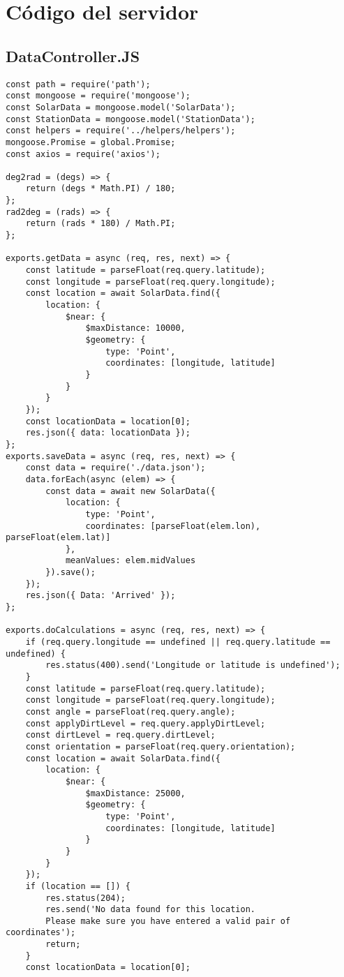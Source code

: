 \section{Código del servidor}

\subsection{DataController.JS}

\begin{lstlisting}[style=ES6, caption={Server/Controllers/dataController.js}]
const path = require('path');
const mongoose = require('mongoose');
const SolarData = mongoose.model('SolarData');
const StationData = mongoose.model('StationData');
const helpers = require('../helpers/helpers');
mongoose.Promise = global.Promise;
const axios = require('axios');

deg2rad = (degs) => {
	return (degs * Math.PI) / 180;
};
rad2deg = (rads) => {
	return (rads * 180) / Math.PI;
};

exports.getData = async (req, res, next) => {
	const latitude = parseFloat(req.query.latitude);
	const longitude = parseFloat(req.query.longitude);
	const location = await SolarData.find({
		location: {
			$near: {
				$maxDistance: 10000,
				$geometry: {
					type: 'Point',
					coordinates: [longitude, latitude]
				}
			}
		}
	});
	const locationData = location[0];
	res.json({ data: locationData });
};
exports.saveData = async (req, res, next) => {
	const data = require('./data.json');
	data.forEach(async (elem) => {
		const data = await new SolarData({
			location: {
				type: 'Point',
				coordinates: [parseFloat(elem.lon), parseFloat(elem.lat)]
			},
			meanValues: elem.midValues
		}).save();
	});
	res.json({ Data: 'Arrived' });
};

exports.doCalculations = async (req, res, next) => {
	if (req.query.longitude == undefined || req.query.latitude == undefined) {
		res.status(400).send('Longitude or latitude is undefined');
	}
	const latitude = parseFloat(req.query.latitude);
	const longitude = parseFloat(req.query.longitude);
	const angle = parseFloat(req.query.angle);
	const applyDirtLevel = req.query.applyDirtLevel;
	const dirtLevel = req.query.dirtLevel;
	const orientation = parseFloat(req.query.orientation);
	const location = await SolarData.find({
		location: {
			$near: {
				$maxDistance: 25000,
				$geometry: {
					type: 'Point',
					coordinates: [longitude, latitude]
				}
			}
		}
	});
	if (location == []) {
		res.status(204);
		res.send('No data found for this location. 
		Please make sure you have entered a valid pair of coordinates');
		return;
	}
	const locationData = location[0];


\end{lstlisting}
